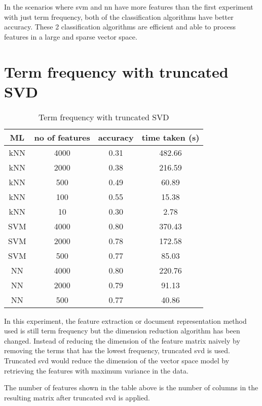 In the scenarios where \ac{svm} and \ac{nn} have more features than the first experiment with just term frequency, both of the classification algorithms have better accuracy. These 2 classification algorithms are efficient and able to process features in a large and sparse vector space.


\section{Term frequency with truncated SVD}

\begin{table} [ht]
	\centering
	\begin{tabular}{|| c | c | c | c||}
		\hline
		ML & no of features & accuracy & time taken (s) \\ [0.5ex]
		\hline\hline
		kNN & 4000 & 0.31 & 482.66 \\
		\hline
		kNN & 2000 & 0.38 & 216.59 \\ 
		\hline
		kNN & 500 & 0.49 & 60.89 \\ 
		\hline
		kNN & 100 & 0.55 & 15.38 \\ 
		\hline
		kNN & 10 & 0.30 & 2.78 \\ 
		\hline\hline
		SVM & 4000 & 0.80 & 370.43 \\
		\hline
		SVM & 2000 & 0.78 & 172.58 \\
		\hline
		SVM & 500 & 0.77 & 85.03 \\
		\hline\hline
		NN & 4000 & 0.80 & 220.76 \\
		\hline
		NN & 2000 & 0.79 & 91.13 \\
		\hline
		NN & 500 & 0.77 & 40.86 \\
		\hline
	\end{tabular}
\caption{Term frequency with truncated SVD}
\label{tbl:termFrequencySvd}
\end{table}

In this experiment, the feature extraction or document representation method used is still term frequency but the dimension reduction algorithm has been changed. Instead of reducing the dimension of the feature matrix naively by removing the terms that has the lowest frequency, truncated \ac{svd} is used. Truncated \ac{svd} would reduce the dimension of the vector space model by retrieving the features with maximum variance in the data.

The number of features shown in the table above is the number of columns in the resulting matrix after truncated \ac{svd} is applied.

